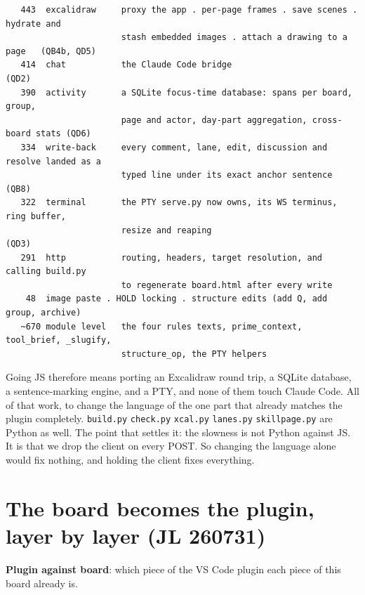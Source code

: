 \begin{verbatim}
   443  excalidraw     proxy the app . per-page frames . save scenes . hydrate and
                       stash embedded images . attach a drawing to a page   (QB4b, QD5)
   414  chat           the Claude Code bridge                                (QD2)
   390  activity       a SQLite focus-time database: spans per board, group,
                       page and actor, day-part aggregation, cross-board stats (QD6)
   334  write-back     every comment, lane, edit, discussion and resolve landed as a
                       typed line under its exact anchor sentence             (QB8)
   322  terminal       the PTY serve.py now owns, its WS terminus, ring buffer,
                       resize and reaping                                     (QD3)
   291  http           routing, headers, target resolution, and calling build.py
                       to regenerate board.html after every write
    48  image paste . HOLD locking . structure edits (add Q, add group, archive)
   ~670 module level   the four rules texts, prime_context, tool_brief, _slugify,
                       structure_op, the PTY helpers
\end{verbatim}
Going JS therefore means porting an Excalidraw round trip, a SQLite database, a sentence-marking engine, and a PTY, and none of them touch Claude Code. All of that work, to change the language of the one part that already matches the plugin completely. \texttt{build.py} \texttt{check.py} \texttt{xcal.py} \texttt{lanes.py} \texttt{skillpage.py} are Python as well. The point that settles it: the slowness is not Python against JS. It is that we drop the client on every POST. So changing the language alone would fix nothing, and holding the client fixes everything.


\section{The board becomes the plugin, layer by layer (JL 260731)}
\textbf{Plugin against board}: which piece of the VS Code plugin each piece of this board already is.

